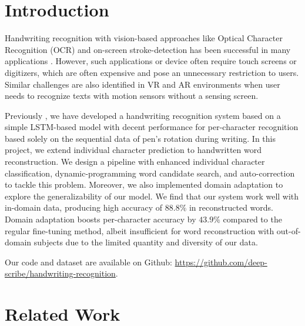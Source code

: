 \documentclass{article}
\begin{document}
\begin{multicols*}{2}




\section{Introduction}

Handwriting recognition with vision-based approaches like Optical Character Recognition (OCR)  \cite{ocr} and on-screen stroke-detection has been successful in many applications \cite{petroski2019fully, jo2019handwritten, bib2, bib3}. However, such applications or device often require touch screens or digitizers, which are often expensive and pose an unnecessary restriction to users. Similar challenges are also identified in VR and AR environments \cite{bib4, amma2012airwriting} when user needs to recognize texts with motion sensors without a sensing screen. 

Previously \cite{ours}, we have developed a handwriting recognition system based on a simple LSTM-based model \cite{lstm} with decent performance for per-character recognition based solely on the sequential data of pen's rotation during writing. In this project, we extend individual character prediction to handwritten word reconstruction. We design a pipeline with enhanced individual character classification, dynamic-programming word candidate search, and auto-correction to tackle this problem. Moreover, we also implemented domain adaptation to explore the generalizability of our model. We find that our system work well with in-domain data, producing high accuracy of $88.8\%$ in reconstructed words. Domain adaptation boosts per-character accuracy by $43.9\%$ compared to the regular fine-tuning method, albeit insufficient for word reconstruction with out-of-domain subjects due to the limited quantity and diversity of our data.

Our code and dataset are available on Github: \url{https://github.com/deep-scribe/handwriting-recognition}. 


\section{Related Work}


\end{multicols*}
\end{document}
